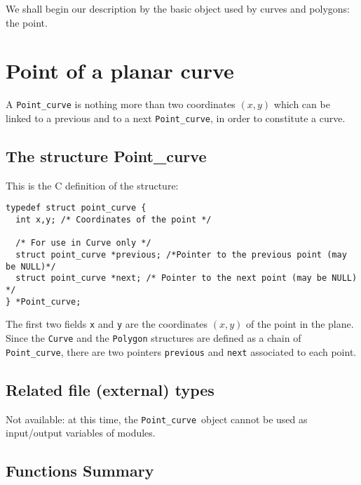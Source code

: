 We shall begin our description by the basic object used by curves and polygons: the point.

\section{Point of a planar curve}


\label{curves-polygons_point}
\def\point{{\tt Point\_curve}}
\index{structure!\point}

A \point{} is nothing more than two coordinates $(x,y)$ which can be linked
to a previous and to a next \point, in order to constitute a curve.

\subsection{The structure Point\_curve}
\label{curves-polygons_point_structure}

This is the C definition of the structure:
{\small
\begin{verbatim}
typedef struct point_curve {
  int x,y; /* Coordinates of the point */

  /* For use in Curve only */
  struct point_curve *previous; /*Pointer to the previous point (may be NULL)*/
  struct point_curve *next; /* Pointer to the next point (may be NULL) */
} *Point_curve;
\end{verbatim}
}

The first two fields \verb+x+ and \verb+y+ are the coordinates $(x,y)$ of
the point in the plane. 
Since the \verb+Curve+ and the \verb+Polygon+ structures are defined as
a chain of \point, there are two pointers \verb+previous+ and \verb+next+ associated to each point.

\subsection{Related file (external) types}
\label{curves-polygons_point-file_type}

Not available: at this time, the \point\ object cannot be used as input/output variables of modules.

\subsection{Functions Summary}
\label{curves-polygons_point_function}

